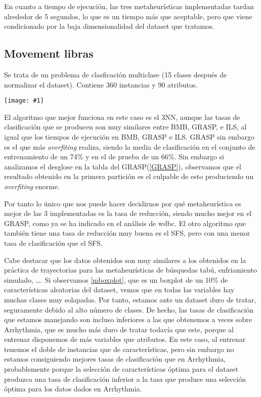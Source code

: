\documentclass[a4paper,11pt]{article}
\newcommand{\imagen}[4]{
  \begin{minipage}{\linewidth}
    \centering
    \texttt{[image: \#1]}
    \captionof{figure}{#2}
    \label{#3}
  \end{minipage} 
}
\begin{document}
  En cuanto a tiempo de ejecución, las tres metaheurísticas implementadas tardan alrededor de 5 segundos, lo que es un tiempo
  más que aceptable, pero que viene condicionado por la baja dimensionalidad del dataset que tratamos.
 
 
  \subsection{Movement libras}
  
  Se trata de un problema de clasficación multiclase (15 clases después de normalizar el dataset). 
  Contiene 360 instancias y 90 atributos.
  
  \imagen{../data/multi-restart/mlibras.png}{Tasas de clasificación en Movement Libras}{mlibras}{0.7}
  
  El algoritmo que mejor funciona en este caso es el 3NN, aunque las tasas de clasificación que se producen son muy similares
  entre BMB, GRASP, e ILS, al igual que los tiempos de ejecución en BMB, GRASP e ILS. GRASP sin embargo es el que más
  \textit{overfiting} realiza, siendo la media de clasificación en el conjunto de entrenamiento de un 74\% y en el de prueba
  de un 66\%. Sin embargo si analizamos el desglose en la tabla del GRASP(\ref{GRASP}), observamos que el resultado obtenido
  en la primera partición es el culpable de esto produciendo un \textit{overfiting} enorme.
  
  Por tanto lo único que nos puede hacer decidirnos por qué metaheurística es mejor de las 3 implementadas es la tasa de reducción,
  siendo mucho mejor en el GRASP, como ya se ha indicado en el análisis de wdbc. El otro algoritmo que también tiene una tasa
  de reducción muy buena es el SFS, pero con una menor tasa de clasificación que el SFS.
  
  Cabe destacar que los datos obtenidos son muy similares a los obtenidos en la práctica de trayectorias para las metaheurísticas
  de búsquedas tabú, enfriamiento simulado, \ldots. Si observamos \ref{mboxplot}, que es un boxplot de un 10\% de características
  aleatorias del dataset, vemos que en todas las variables hay muchas clases muy solapadas. 
  Por tanto, estamos ante un dataset duro de tratar, seguramente debido al alto número de clases. 
  De hecho, las tasas de clasificación que estamos manejando son incluso inferiores a las que obtenemos a veces sobre 
  Arrhythmia, que es mucho más duro de tratar todavía que este, porque al entrenar disponemos de más variables que 
  atributos. En este caso, al entrenar tenemos el doble de instancias que de características, pero sin embargo no estamos
  consiguiendo mejores tasas de clasificación que en Arrhythmia, probablemente porque la selección de características óptima
  para el dataset produzca una tasa de clasificación inferior a la tasa que produce una selección óptima para los datos dados
  en Arrhythmia.
  
\end{document}

